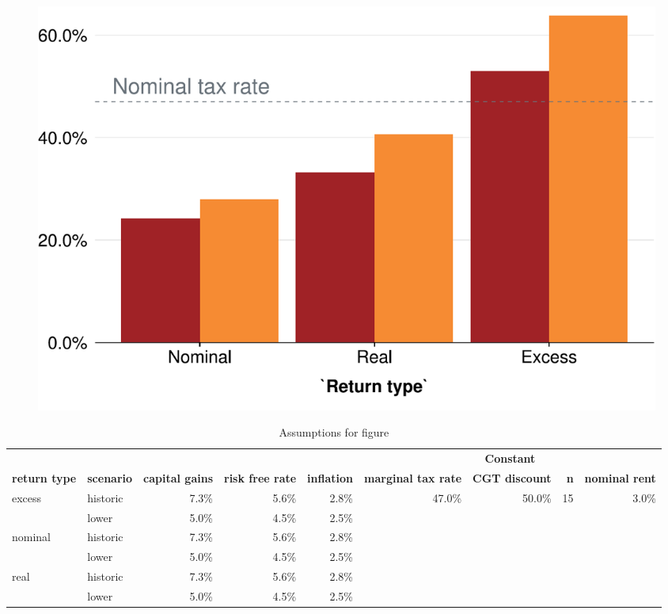 \documentclass{grattan}\usepackage[]{graphicx}\usepackage[]{color}
\begin{document}
\begin{figure}


\includegraphics[width=\columnwidth]{CGT-NG-atlas//EMTR-nominal-real-excess-historic-vs-lower-1}
\end{figure}
\begin{table}
\centering
\caption{Assumptions for figure }
\small
\begin{tabular}{llrrrrrrr}
  \toprule
   &  &  &  &  & \multicolumn{4}{c}{\textbf{Constant}}\\
 \cmidrule(lr){6-9}
 \textbf{return type} & \textbf{scenario} & \textbf{capital gains} & \textbf{risk free rate} & \textbf{inflation} & \textbf{marginal tax rate} & \textbf{CGT discount} & \textbf{n} & \textbf{nominal rent}\\
 \midrule
excess & historic & 7.3\% & 5.6\% & 2.8\% & 47.0\% & 50.0\% & 15 & 3.0\% \\ 
   & lower & 5.0\% & 4.5\% & 2.5\% &  &  &  &  \\ 
  nominal & historic & 7.3\% & 5.6\% & 2.8\% &  &  &  &  \\ 
   & lower & 5.0\% & 4.5\% & 2.5\% &  &  &  &  \\ 
  real & historic & 7.3\% & 5.6\% & 2.8\% &  &  &  &  \\ 
   & lower & 5.0\% & 4.5\% & 2.5\% &  &  &  &  \\ 
   \bottomrule
\end{tabular}

\end{table}
\end{document}
